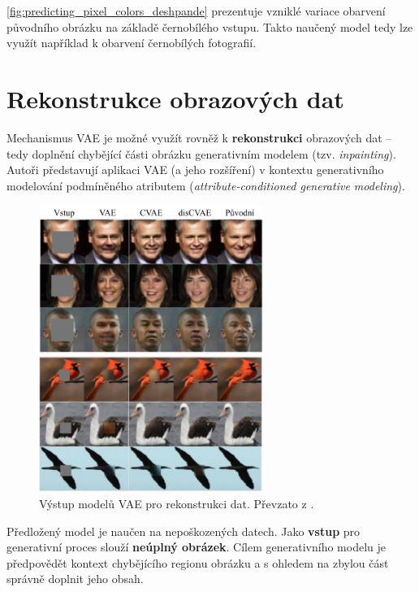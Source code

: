 \autoref{fig:predicting_pixel_colors_deshpande} prezentuje vzniklé variace obarvení původního obrázku na základě černobílého vstupu.
Takto naučený model tedy lze využít například k obarvení černobílých fotografií.

\newpage
\section{Rekonstrukce obrazových dat}
\label{sec:applications_image_reconstruction}
Mechanismus VAE je možné využít rovněž k \textbf{rekonstrukci} obrazových dat – tedy doplnění chybějící části obrázku generativním modelem (tzv. \emph{inpainting}).
Autoři \textcite{Yan2016} představují aplikaci VAE (a jeho rozšíření) v kontextu generativního modelování podmíněného atributem (\emph{attribute-conditioned generative modeling}).

\begin{figure}[H]
    \centering
    \includegraphics[width=0.65\textwidth]{figures/applications/image_inpainting_yan.pdf}
    \caption{Výstup modelů VAE pro rekonstrukci dat. Převzato z \textcite{Yan2016}.}
    \label{fig:image_inpainting_yan}
\end{figure}

Předložený model je naučen na nepoškozených datech. Jako \textbf{vstup} pro generativní proces slouží \textbf{neúplný obrázek}.
Cílem generativního modelu je předpovědět kontext chybějícího regionu obrázku a s ohledem na zbylou část správně doplnit jeho obsah. \cite{Yan2016}

